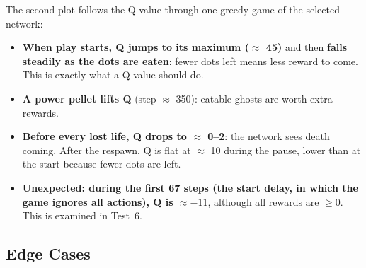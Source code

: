 The second plot follows the Q-value through one greedy game of the selected network:


\begin{itemize}
  \item \textbf{When play starts, Q jumps to its maximum ($\approx$ 45)} and then \textbf{falls steadily as the dots are eaten}: fewer dots left means less reward to come. This is exactly what a Q-value should do.
  \item \textbf{A power pellet lifts Q} (step $\approx$ 350): eatable ghosts are worth extra rewards.
  \item \textbf{Before every lost life, Q drops to $\approx$ 0--2}: the network sees death coming. After the respawn, Q is flat at $\approx$ 10 during the pause, lower than at the start because fewer dots are left.
  \item \textbf{Unexpected: during the first 67 steps (the start delay, in which the game ignores all actions), Q is $\approx -11$}, although all rewards are $\geq 0$. This is examined in Test~6.
\end{itemize}

\subsection{Edge Cases}

